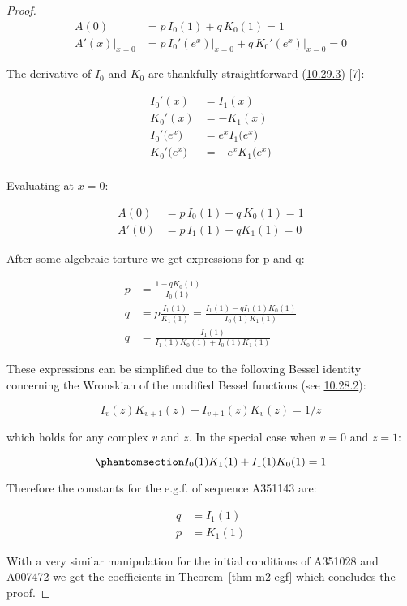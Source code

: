 \documentclass[
  letterpaper,
  DIV=11,
  numbers=noendperiod]{scrartcl}
\theoremstyle{plain}
\theoremstyle{remark}
\begin{document}
\begin{proof}
\[
\begin{aligned}
A(0) & = p\, I_0(1) + q\,K_0(1) = 1 \\
A'(x)\bigr|_{x=0} &=p\, I_0'(e^x)\bigr|_{x=0} + q\,K_0'(e^x)\bigr|_{x=0} = 0
\end{aligned}
\]

The derivative of \(I_0\) and \(K_0\) are thankfully straightforward
(\href{https://dlmf.nist.gov/10.29.E3}{10.29.3}) {[}7{]}:

\[
\begin{aligned}
I_0'(x) &= I_1(x) \\ K_0'(x) &= -K_1(x) \\I_0'\bigl(e^x\bigr) &= e^xI_1\bigl(e^x\bigr) \\ K_0'\bigl(e^x\bigr) &= -e^xK_1\bigl(e^x\bigr) \\
\end{aligned}
\]

Evaluating at \(x=0\):

\[
\begin{aligned}
A(0) & = p \,I_0(1)+q\,K_0(1) = 1 \\
A'(0) & = p\,I_1(1)-q K_1(1) = 0
\end{aligned}
\]

After some algebraic torture we get expressions for p and q:

\[
\begin{aligned}
p &= \frac{1-qK_0(1)}{I_0(1)} \\
q &= p\frac{I_1(1)}{K_1(1)} = \frac{I_1(1)-qI_1(1)K_0(1)}{I_0(1)K_1(1)} \\
q &= \frac{I_1(1)}{I_1(1)K_0(1)+I_0(1)K_1(1)}
\end{aligned}
\]

These expressions can be simplified due to the following Bessel identity
concerning the Wronskian of the modified Bessel functions (see
\href{https://dlmf.nist.gov/10.28.E2}{10.28.2}):

\[
I_v(z)K_{v+1}(z)+I_{v+1}(z)K_v(z) = 1/z
\]

which holds for any complex \(v\) and \(z\). In the special case when
\(v = 0\) and \(z=1\):

\begin{equation}\phantomsection\label{eq-bessel-wronskian}{
I_0(1)K_1(1)+I_1(1)K_0(1) = 1
}\end{equation}

Therefore the constants for the e.g.f. of sequence A351143 are:

\[
\begin{aligned}
q &= I_1(1) \\
p &= K_1(1)
\end{aligned}
\]

With a very similar manipulation for the initial conditions of A351028
and A007472 we get the coefficients in Theorem~\ref{thm-m2-egf} which
concludes the proof.
\end{proof}
\end{document}
